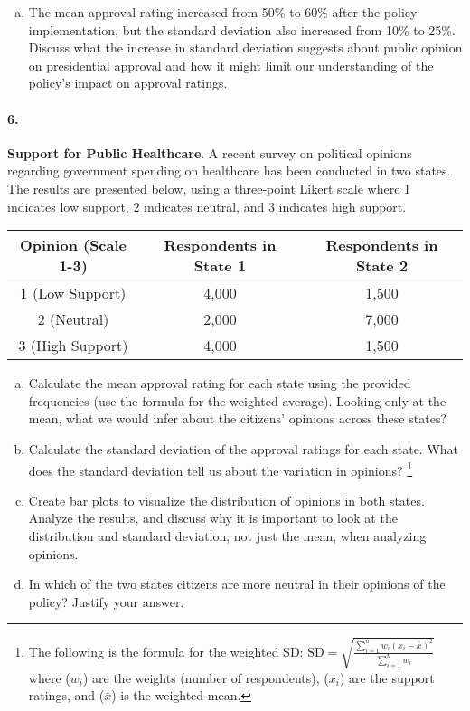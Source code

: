 \documentclass{article}
\begin{document}
\begin{enumerate}[a)]
    \item The mean approval rating increased from 50\% to 60\% after the policy implementation, but the standard deviation also increased from 10\% to 25\%. Discuss what the increase in standard deviation suggests about public opinion on presidential approval and how it might limit our understanding of the policy's impact on approval ratings.
\end{enumerate}

\paragraph{6.} \textbf{Support for Public Healthcare}. A recent survey on political opinions regarding government spending on healthcare has been conducted in two states. The results are presented below, using a three-point Likert scale where 1 indicates low support, 2 indicates neutral, and 3 indicates high support.

\begin{center}
\begin{tabular}{|c|c|c|}
\hline Opinion (Scale 1-3) & Respondents in State 1 & Respondents in State 2 \\
\hline 1 (Low Support) & 4,000 & 1,500 \\
2 (Neutral) & 2,000 & 7,000 \\
3 (High Support) & 4,000 & 1,500 \\
\hline
\end{tabular}
\end{center}

\begin{enumerate}[a)]
    \item Calculate the mean approval rating for each state using the provided frequencies (use the formula for the weighted average). Looking only at the mean, what we would infer about the citizens' opinions across these states?
    \item Calculate the standard deviation of the approval ratings for each state. What does the standard deviation tell us about the variation in opinions? \footnote{The following is the formula for the weighted SD: $\text{SD} = \sqrt{\frac{\sum_{i=1}^n w_i (x_i - \bar{x})^2}{\sum_{i=1}^n w_i}} $ where ($w_i$) are the weights (number of respondents), ($x_i$) are the support ratings, and ($\bar{x}$) is the weighted mean.}
    \item Create bar plots to visualize the distribution of opinions in both states. Analyze the results, and discuss why it is important to look at the distribution and standard deviation, not just the mean, when analyzing opinions.
    \item In which of the two states citizens are more neutral in their opinions of the policy? Justify your answer.
\end{enumerate}
\end{document}
